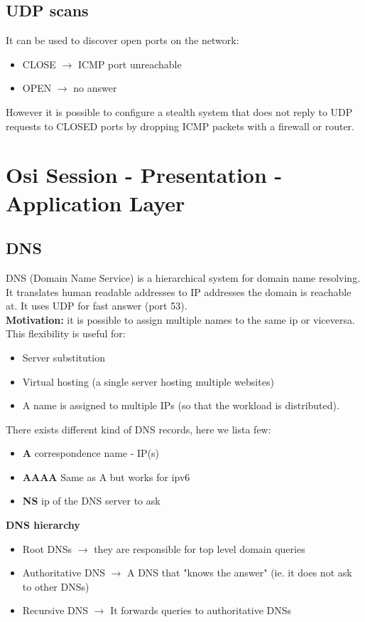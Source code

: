 \documentclass[10pt,a4paper]{book}
\begin{document}
\section{UDP scans}
It can be used to discover open ports on the network:
\begin{itemize}
\item CLOSE $\to$ ICMP port unreachable
\item OPEN $\to$ no answer
\end{itemize}
However it is possible to configure a stealth system that does not reply to UDP requests to CLOSED ports by dropping ICMP packets with a firewall or router.
\chapter{Osi Session - Presentation - Application Layer}
\section{DNS}
DNS (Domain Name Service) is a hierarchical system for domain name resolving. It translates human readable addresses to IP addresses the domain is reachable at. It uses UDP for fast answer (port 53).\\
\textbf{Motivation:} it is possible to assign multiple names to the same ip or viceversa. This flexibility is useful for:
\begin{itemize}[noitemsep,nolistsep]
\item Server substitution
\item Virtual hosting (a single server hosting multiple websites)
\item A name is assigned to multiple IPs (so that the workload is distributed).
\end{itemize}
There exists different kind of DNS records, here we lista few:
\begin{itemize}[noitemsep,nolistsep]
\item \textbf{A} correspondence name - IP(s)
\item \textbf{AAAA} Same as A but works for ipv6
\item \textbf{NS} ip of the DNS server to ask
\end{itemize}
\textbf{DNS hierarchy}
\begin{itemize}[noitemsep,nolistsep]
\item Root DNSs $\to$ they are responsible for top level domain queries
\item Authoritative DNS $\to$ A DNS that "knows the answer" (ie. it does not ask to other DNSs)
\item Recursive DNS $\to$ It forwards queries to authoritative DNSs
\end{itemize}
\end{document}
